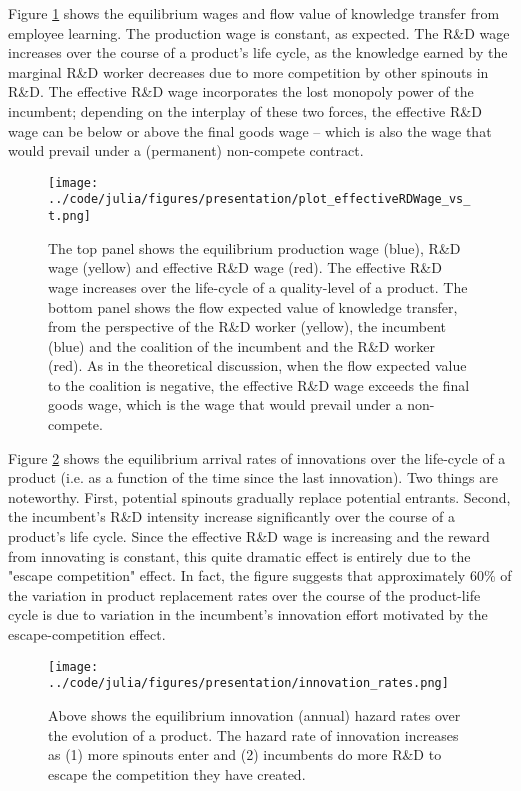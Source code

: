 \documentclass[11pt,english]{article}
\theoremstyle{remark}
\begin{document}
Figure \ref{RD_wages} shows the equilibrium wages and flow value of knowledge transfer from employee learning. The production wage is constant, as expected. The R\&D wage increases over the course of a product's life cycle, as the knowledge earned by the marginal R\&D worker decreases due to more competition by other spinouts in R\&D. The effective R\&D wage incorporates the lost monopoly power of the incumbent; depending on the interplay of these two forces, the effective R\&D wage can be below or above the final goods wage -- which is also the wage that would prevail under a (permanent) non-compete contract.

\begin{figure}[h]  
	\centering
	\texttt{[image: ../code/julia/figures/presentation/plot\_effectiveRDWage\_vs\_t.png]}
	\caption{The top panel shows the equilibrium production wage (blue), R\&D wage (yellow) and effective R\&D wage (red). The effective R\&D wage increases over the life-cycle of a quality-level of a product. The bottom panel shows the flow expected value of knowledge transfer, from the perspective of the R\&D worker (yellow), the incumbent (blue) and the coalition of the incumbent and the R\&D worker (red). As in the theoretical discussion, when the flow expected value to the coalition is negative, the effective R\&D wage exceeds the final goods wage, which is the wage that would prevail under a non-compete.}
	\label{RD_wages}
\end{figure}


Figure \ref{innovation_rates} shows the equilibrium arrival rates of innovations over the life-cycle of a product (i.e. as a function of the time since the last innovation). Two things are noteworthy. First, potential spinouts gradually replace potential entrants. Second, the incumbent's R\&D intensity increase significantly over the course of a product's life cycle. Since the effective R\&D wage is increasing and the reward from innovating is constant, this quite dramatic effect is entirely due to the "escape competition" effect. In fact, the figure suggests that approximately 60\% of the variation in product replacement rates over the course of the product-life cycle is due to variation in the incumbent's innovation effort motivated by the escape-competition effect.

\begin{figure}[h] 
	\centering
	\texttt{[image: ../code/julia/figures/presentation/innovation\_rates.png]}
	\caption{Above shows the equilibrium innovation (annual) hazard rates over the evolution of a product. The hazard rate of innovation increases as (1) more spinouts enter and (2) incumbents do more R\&D to escape the competition they have created.}
	\label{innovation_rates}
\end{figure}
\end{document}
